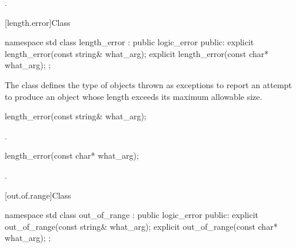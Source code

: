 \begin{itemdescr}

\pnum
\ensures
{}.
\end{itemdescr}

[length.error]{Class }

%
\begin{codeblock}
namespace std {
  class length_error : public logic_error {
  public:
    explicit length_error(const string& what_arg);
    explicit length_error(const char* what_arg);
  };
}
\end{codeblock}

\pnum
The class
defines the type of objects thrown as exceptions
to report an attempt to produce
an object whose length exceeds its maximum allowable size.

%
\begin{itemdecl}
length_error(const string& what_arg);
\end{itemdecl}

\begin{itemdescr}

\pnum
\ensures
{}.
\end{itemdescr}

%
\begin{itemdecl}
length_error(const char* what_arg);
\end{itemdecl}

\begin{itemdescr}

\pnum
\ensures
{}.
\end{itemdescr}

[out.of.range]{Class }

%
\begin{codeblock}
namespace std {
  class out_of_range : public logic_error {
  public:
    explicit out_of_range(const string& what_arg);
    explicit out_of_range(const char* what_arg);
  };
}
\end{codeblock}

